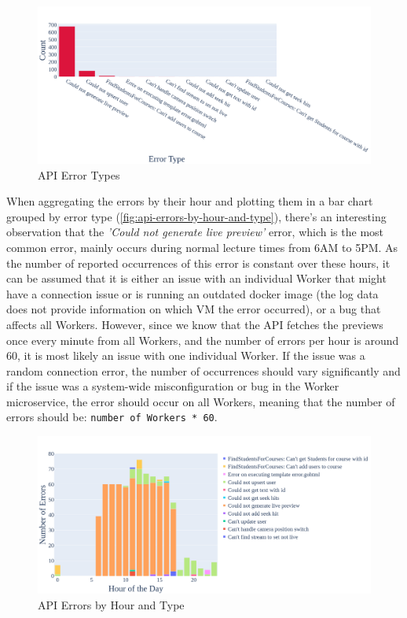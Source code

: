 \begin{figure}[htpb]
    \centering
    \includegraphics[width=\linewidth]{images/plots/api/error_types.png}
    \caption[\ac{API} Error Types]{\ac{API} Error Types}\label{fig:api-error-types}
\end{figure}
\break

\noindent When aggregating the errors by their hour and plotting them in a bar chart grouped by error type (\autoref{fig:api-errors-by-hour-and-type}), there's an interesting observation that the \textit{'Could not generate live preview'} error, which is the most common error, mainly occurs during normal lecture times from 6AM to 5PM. As the number of reported occurrences of this error is constant over these hours, it can be assumed that it is either an issue with an individual Worker that might have a connection issue or is running an outdated docker image (the log data does not provide information on which \ac{VM} the error occurred), or a bug that affects all Workers. However, since we know that the \ac{API} fetches the previews once every minute from all Workers, and the number of errors per hour is around 60, it is most likely an issue with one individual Worker. If the issue was a random connection error, the number of occurrences should vary significantly and if the issue was a system-wide misconfiguration or bug in the Worker microservice, the error should occur on all Workers, meaning that the number of errors should be: \texttt{number of Workers * 60}.     

\begin{figure}[htpb]
    \centering
    \includegraphics[width=\linewidth]{images/plots/api/errors_by_hour_and_type.png}
    \caption[\ac{API} Errors by Hour and Type]{\ac{API} Errors by Hour and Type}\label{fig:api-errors-by-hour-and-type}
\end{figure}

